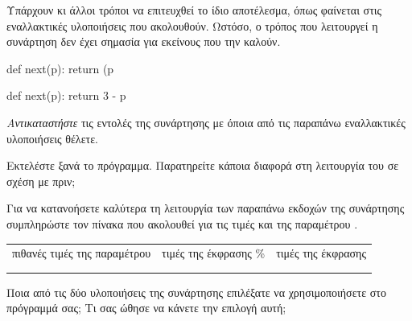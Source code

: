 \documentclass[a4paper,11pt,oneside]{book}
\begin{document}
\begin{step}
Υπάρχουν κι άλλοι τρόποι να επιτευχθεί το ίδιο αποτέλεσμα, όπως φαίνεται στις εναλλακτικές υλοποιήσεις που ακολουθούν. Ωστόσο, ο τρόπος που λειτουργεί η συνάρτηση δεν έχει σημασία για εκείνους που την καλούν.

\begin{minipage}{0.48\textwidth}
\begin{pycode}
def next(p):
    return (p %
\end{pycode}
\end{minipage}\hfill
\begin{minipage}{0.48\textwidth}
\begin{pycode}
def next(p):
    return 3 - p
\end{pycode}
\end{minipage}


\emph{Αντικαταστήστε} τις εντολές της συνάρτησης  με όποια από τις παραπάνω εναλλακτικές υλοποιήσεις θέλετε. 

Εκτελέστε ξανά το πρόγραμμα. Παρατηρείτε κάποια διαφορά στη λειτουργία του σε σχέση με πριν;

\marginnote[14pt]{\icondiscuss}
\dottedline

Για να κατανοήσετε καλύτερα τη λειτουργία των παραπάνω εκδοχών της συνάρτησης  συμπληρώστε τον πίνακα που ακολουθεί για τις τιμές  και  της παραμέτρου .

\begin{center}
\vspace{-3pt}
\begin{tabular}{cp{84pt}p{84pt}}
\parbox[c][0pt][c]{76pt}{\center\small πιθανές τιμές της παραμέτρου } & %
\parbox[c][0pt][c]{84pt}{\center\small τιμές της έκφρασης  \% } &
\parbox[c][0pt][c]{84pt}{\center\small τιμές της έκφρασης }\\\addlinespace[3\parskip]
 & \dotfill & \dotfill\\\addlinespace[\parskip]
 & \dotfill & \dotfill\\%
\end{tabular}
\vspace{-3pt}
\end{center}

Ποια από τις δύο υλοποιήσεις της συνάρτησης  επιλέξατε να χρησιμοποιήσετε στο πρόγραμμά σας; Τι σας ώθησε να κάνετε την επιλογή αυτή;


\end{step}
\end{document}
